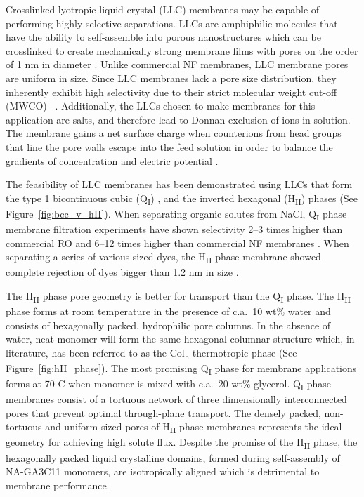\documentclass[journal=jpcbfk,manusciprt=article]{achemso}
\begin{document}
  Crosslinked lyotropic liquid crystal (LLC) membranes may be capable of
  performing highly selective separations. LLCs are amphiphilic molecules that
  have the ability to self-assemble into porous nanostructures
  \cite{smith_ordered_1997} which can be crosslinked to create mechanically
  strong membrane films with pores on the order of 1 nm in diameter
  \cite{zhou_supported_2005}. Unlike commercial NF membranes, LLC membrane pores
  are uniform in size. Since LLC membranes lack a pore size distribution, they
  inherently exhibit high selectivity due to their strict molecular weight
  cut-off (MWCO) ~\cite{zhou_supported_2005}. Additionally, the LLCs chosen to
  make membranes for this application are salts, and therefore lead to Donnan
  exclusion of ions in solution. The membrane gains a net surface charge when
  counterions from head groups that line the pore walls escape into the feed
  solution in order to balance the gradients of concentration and electric
  potential \cite{donnan_theory_1995}.    

  The feasibility of LLC membranes has been demonstrated using LLCs that form
  the type 1 bicontinuous cubic (Q\textsubscript{I})
  \cite{hatakeyama_water_2011,hatakeyama_nanoporous_2010,carter_glycerol-based_2012},
  and the inverted hexagonal (H\textsubscript{II}) \cite{zhou_supported_2005}
  phases (See Figure~\ref{fig:bcc_v_hII}). When separating organic solutes from
  NaCl, Q\textsubscript{I} phase membrane filtration experiments have shown
  selectivity 2--3 times higher than commercial RO and 6--12 times higher than
  commercial NF membranes \cite{dischinger_application_2017}.  When separating a
  series of various sized dyes, the H\textsubscript{II} phase membrane showed
  complete rejection of dyes bigger than 1.2 nm in size
  \cite{zhou_supported_2005}. 

  The H\textsubscript{II} phase pore geometry is better for transport than the
  Q\textsubscript{I} phase. The H\textsubscript{II} phase forms at room
  temperature in the presence of c.a.~10 wt\% water and consists of hexagonally
  packed, hydrophilic pore columns\cite{smith_ordered_1997}. In the absence of
  water, neat monomer will form the same hexagonal columnar structure which, in
  literature, has been referred to as the Col\textsubscript{h} thermotropic
  phase\cite{feng_scalable_2014} (See Figure~\ref{fig:hII_phase}).  The most
  promising Q\textsubscript{I} phase for membrane applications forms at 70\degree
  C when monomer is mixed with c.a.~20 wt\%
  glycerol\cite{carter_glycerol-based_2012}. Q\textsubscript{I} phase membranes
  consist of a tortuous network of three dimensionally interconnected pores that
  prevent optimal through-plane transport. The densely packed, non-tortuous and
  uniform sized pores of H\textsubscript{II} phase membranes represents the ideal
  geometry for achieving high solute flux\cite{matyka_tortuosity-porosity_2008}.
  Despite the promise of the H\textsubscript{II} phase, the hexagonally packed
  liquid crystalline domains, formed during self-assembly of NA-GA3C11 monomers, are
  isotropically aligned which is detrimental to membrane performance. 
\end{document}
